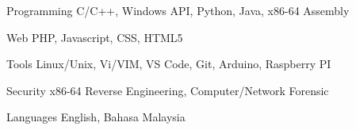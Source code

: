 

\begin{cvskills}

  \cvskill
    {Programming} %
    {C/C++, Windows API, Python, Java, x86-64 Assembly} %

  \cvskill
    {Web} %
    {PHP, Javascript, CSS, HTML5} %

  \cvskill
    {Tools} %
    {Linux/Unix, Vi/VIM, VS Code, Git, Arduino, Raspberry PI} %

  \cvskill
    {Security} %
    {x86-64 Reverse Engineering, Computer/Network Forensic} %

  \cvskill
    {Languages} %
    {English, Bahasa Malaysia} %

\end{cvskills}
